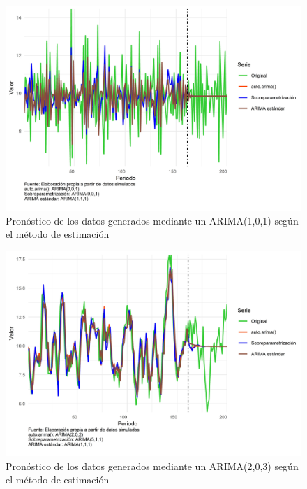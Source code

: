 \documentclass[
]{article}
\begin{document}
\begin{figure}[H]
\includegraphics[width=1\linewidth,height=1\textheight]{Tesis_files/figure-latex/pronostico_arima101-1} \caption{Pronóstico de los datos generados mediante un ARIMA(1,0,1) según el método de estimación}\label{fig:pronostico_arima101}
\end{figure}

\begin{figure}[H]
\includegraphics[width=1\linewidth,height=1\textheight]{Tesis_files/figure-latex/pronostico_arima203-1} \caption{Pronóstico de los datos generados mediante un ARIMA(2,0,3) según el método de estimación}\label{fig:pronostico_arima203}
\end{figure}
\end{document}
